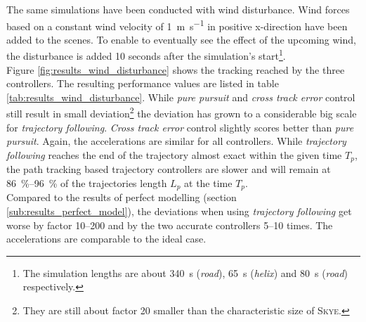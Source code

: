 The same simulations have been conducted with wind disturbance. Wind forces based on a constant wind velocity of \SI{1}{\meter\per\second} in positive x-direction have been added to the scenes. To enable to eventually see the effect of the upcoming wind, the disturbance is added 10 seconds after the simulation's start\footnote{The simulation lengths are about \SI{340}{\second} (\textit{road}), \SI{65}{\second} (\textit{helix}) and \SI{80}{\second} (\textit{road}) respectively.}. \\
Figure \ref{fig:results_wind_disturbance} shows the tracking reached by the three controllers. The resulting performance values are listed in table \ref{tab:results_wind_disturbance}. While \textit{pure pursuit} and \textit{cross track error} control still result in small deviation\footnote{They are still about factor 20 smaller than the characteristic size of \textsc{Skye}.} the deviation has grown to a considerable big scale for \textit{trajectory following}. \textit{Cross track error} control slightly scores better than \textit{pure pursuit}. Again, the accelerations are similar for all controllers. While \textit{trajectory following} reaches the end of the trajectory almost exact within the given time $T_p$, the path tracking based trajectory controllers are slower and will remain at \SIrange{86}{96}{\percent} of the trajectories length $L_p$ at the time $T_p$. \\
Compared to the results of perfect modelling (section \ref{sub:results_perfect_model}), the deviations when using \textit{trajectory following} get worse by factor \numrange{10}{200} and by the two accurate controllers \numrange{5}{10} times. The accelerations are comparable to the ideal case.

